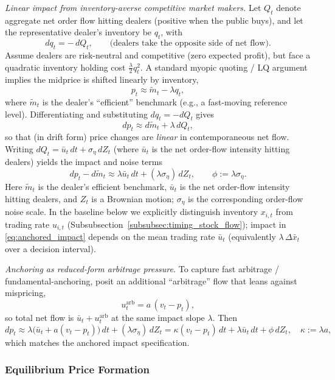 \emph{Linear impact from inventory-averse competitive market makers.}
Let $Q_t$ denote aggregate net order flow hitting dealers (positive when the public buys),
and let the representative dealer's inventory be $q_t$, with
\[
dq_t = -\,dQ_t, \qquad \text{(dealers take the opposite side of net flow).}
\]
Assume dealers are risk-neutral and competitive (zero expected profit), but face a quadratic
inventory holding cost $\frac{\lambda}{2}q_t^2$.
A standard myopic quoting / LQ argument implies the midprice is shifted linearly by inventory,
\[
p_t \approx \tilde m_t - \lambda q_t,
\]
where $\tilde m_t$ is the dealer's ``efficient'' benchmark (e.g., a fast-moving reference level).
Differentiating and substituting $dq_t=-dQ_t$ gives
\[
dp_t \approx d\tilde m_t + \lambda\, dQ_t,
\]
so that (in drift form) price changes are \emph{linear} in contemporaneous net flow. Writing
$dQ_t = \bar u_t\,dt + \sigma_\eta\,dZ_t$ (where $\bar u_t$ is the net order-flow intensity hitting dealers) yields the impact and noise terms
\[
dp_t-d\tilde m_t \approx \lambda \bar u_t\,dt + (\lambda\sigma_\eta)\, dZ_t,
\qquad \phi := \lambda\sigma_\eta.
\]
Here $\tilde m_t$ is the dealer's efficient benchmark, $\bar u_t$ is the net order-flow intensity hitting dealers, and $Z_t$ is a Brownian motion; $\sigma_\eta$ is the corresponding order-flow noise scale.
In the baseline below we explicitly distinguish inventory $x_{i,t}$ from trading rate $u_{i,t}$ (Subsubsection~\ref{subsubsec:timing_stock_flow}); impact in \eqref{eq:anchored_impact} depends on the mean trading rate $\bar u_t$ (equivalently $\lambda\,\Delta\bar x_t$ over a decision interval).

\emph{Anchoring as reduced-form arbitrage pressure.}
To capture fast arbitrage / fundamental-anchoring, posit an additional ``arbitrage'' flow that
leans against mispricing,
\[
u^{\mathrm{arb}}_t = a\,(v_t - p_t),
\]
so total net flow is $\bar u_t + u^{\mathrm{arb}}_t$ at the same impact slope $\lambda$.
Then
\[
dp_t \approx \lambda\big(\bar u_t + a(v_t-p_t)\big)\,dt + (\lambda\sigma_\eta)\,dZ_t
= \kappa(v_t-p_t)\,dt + \lambda \bar u_t\,dt + \phi\,dZ_t,
\quad \kappa := \lambda a,
\]
which matches the anchored impact specification.

\subsubsection{Equilibrium Price Formation}


